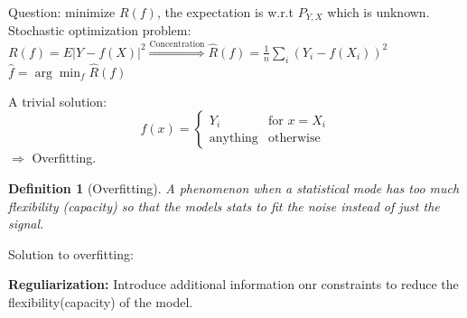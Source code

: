 \documentclass{article}
\newtheorem{definition}{Definition}
\begin{document}
Question: minimize $R(f)$, the expectation is w.r.t $P_{Y, X}$ which is unknown.
Stochastic optimization problem:
$R(f) = E|Y - f(X)|^2 \overset{\text{Concentration}}\Rightarrow \hat R(f) = \frac1n \sum_i (Y_i - f(X_i))^2$
$\hat f = \arg \min_f \hat R(f)$

A trivial solution:
\[
  f(x) = \left\{
    \begin{array}{cc}
                  Y_i&\text{for }x = X_i \\
                  \text{anything}&\text{otherwise}
    \end{array}
  \right.
\]
$\Rightarrow$ Overfitting.

\begin{definition}[Overfitting]
  A phenomenon when a statistical mode has too much flexibility (capacity) so that the models stats to fit the noise instead of just the signal.
\end{definition}
Solution to overfitting:

\textbf{Reguliarization:} Introduce additional information onr constraints to reduce the flexibility(capacity) of the model.
\end{document}
